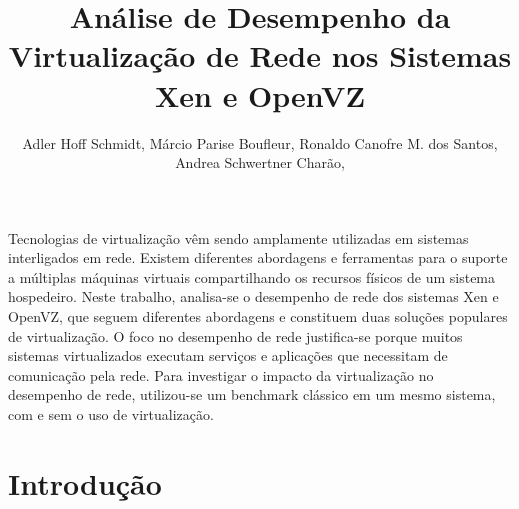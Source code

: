 \documentclass[12pt]{article}
\title{Análise de Desempenho da Virtualização de Rede nos Sistemas Xen e OpenVZ}
\author{Adler Hoff Schmidt\inst{2}, Márcio Parise Boufleur\inst{1}, Ronaldo Canofre M. dos Santos\inst{2},\\ Andrea Schwertner Charão\inst{1},\inst{2}}
\begin{document}
 

\maketitle


\begin{resumo} 
Tecnologias de virtualização vêm sendo amplamente utilizadas em sistemas interligados em rede. Existem diferentes abordagens e ferramentas para o suporte a múltiplas máquinas virtuais compartilhando os recursos físicos de um sistema hospedeiro. Neste trabalho, analisa-se o desempenho de rede dos sistemas Xen e OpenVZ, que seguem diferentes abordagens e constituem duas soluções populares de virtualização. O foco no desempenho de rede justifica-se porque muitos sistemas virtualizados executam serviços e aplicações que necessitam de comunicação pela rede. Para investigar o impacto da virtualização no desempenho de rede, utilizou-se um benchmark clássico em um mesmo sistema, com e sem o uso de virtualização.
\end{resumo}


\section{Introdução}
\end{document}
